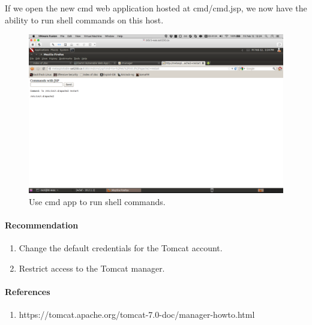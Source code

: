 \documentclass{article}
\begin{document}
\newpage
If we open the new cmd web application hosted at cmd/cmd.jsp, we now have the
ability to run shell commands on this host.

\begin{figure}[h!]
	\includegraphics[width=\linewidth]{images/tomcat-metasploitable-cmd.png}
	\caption{Use cmd app to run shell commands.}
	\label{fig:tomcat-injection5}
\end{figure}

\paragraph{Recommendation}

\begin{enumerate}
  \item Change the default credentials for the Tomcat account.
  \item Restrict access to the Tomcat manager.
\end{enumerate}

\paragraph{References}

\begin{enumerate}
  \item https://tomcat.apache.org/tomcat-7.0-doc/manager-howto.html
\end{enumerate}
\end{document}
